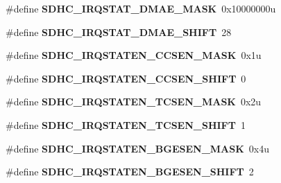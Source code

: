 \begin{DoxyCompactItemize}
\item 
\hypertarget{group___s_d_h_c___register___masks_gac96246ff1e63bd8572c8e5dbe9f0af38}{}\#define {\bfseries S\+D\+H\+C\+\_\+\+I\+R\+Q\+S\+T\+A\+T\+\_\+\+D\+M\+A\+E\+\_\+\+M\+A\+S\+K}~0x10000000u\label{group___s_d_h_c___register___masks_gac96246ff1e63bd8572c8e5dbe9f0af38}

\item 
\hypertarget{group___s_d_h_c___register___masks_ga00be94aaf735d641b66038501ab81c35}{}\#define {\bfseries S\+D\+H\+C\+\_\+\+I\+R\+Q\+S\+T\+A\+T\+\_\+\+D\+M\+A\+E\+\_\+\+S\+H\+I\+F\+T}~28\label{group___s_d_h_c___register___masks_ga00be94aaf735d641b66038501ab81c35}

\item 
\hypertarget{group___s_d_h_c___register___masks_ga1ab5a76edc7d9d1b3458f6e111a47d29}{}\#define {\bfseries S\+D\+H\+C\+\_\+\+I\+R\+Q\+S\+T\+A\+T\+E\+N\+\_\+\+C\+C\+S\+E\+N\+\_\+\+M\+A\+S\+K}~0x1u\label{group___s_d_h_c___register___masks_ga1ab5a76edc7d9d1b3458f6e111a47d29}

\item 
\hypertarget{group___s_d_h_c___register___masks_gadbf850c08e3d0acfe9d03da53ac61b52}{}\#define {\bfseries S\+D\+H\+C\+\_\+\+I\+R\+Q\+S\+T\+A\+T\+E\+N\+\_\+\+C\+C\+S\+E\+N\+\_\+\+S\+H\+I\+F\+T}~0\label{group___s_d_h_c___register___masks_gadbf850c08e3d0acfe9d03da53ac61b52}

\item 
\hypertarget{group___s_d_h_c___register___masks_gac97f75c248571976edfb322bda13864e}{}\#define {\bfseries S\+D\+H\+C\+\_\+\+I\+R\+Q\+S\+T\+A\+T\+E\+N\+\_\+\+T\+C\+S\+E\+N\+\_\+\+M\+A\+S\+K}~0x2u\label{group___s_d_h_c___register___masks_gac97f75c248571976edfb322bda13864e}

\item 
\hypertarget{group___s_d_h_c___register___masks_gae491cb6cce5060d01d37d180b32ac94c}{}\#define {\bfseries S\+D\+H\+C\+\_\+\+I\+R\+Q\+S\+T\+A\+T\+E\+N\+\_\+\+T\+C\+S\+E\+N\+\_\+\+S\+H\+I\+F\+T}~1\label{group___s_d_h_c___register___masks_gae491cb6cce5060d01d37d180b32ac94c}

\item 
\hypertarget{group___s_d_h_c___register___masks_ga46d5c9b348b825831e0fb397ede43a9a}{}\#define {\bfseries S\+D\+H\+C\+\_\+\+I\+R\+Q\+S\+T\+A\+T\+E\+N\+\_\+\+B\+G\+E\+S\+E\+N\+\_\+\+M\+A\+S\+K}~0x4u\label{group___s_d_h_c___register___masks_ga46d5c9b348b825831e0fb397ede43a9a}

\item 
\hypertarget{group___s_d_h_c___register___masks_ga6fa2e791021ce11cf32108b91c82ba6e}{}\#define {\bfseries S\+D\+H\+C\+\_\+\+I\+R\+Q\+S\+T\+A\+T\+E\+N\+\_\+\+B\+G\+E\+S\+E\+N\+\_\+\+S\+H\+I\+F\+T}~2\label{group___s_d_h_c___register___masks_ga6fa2e791021ce11cf32108b91c82ba6e}


\end{DoxyCompactItemize}
